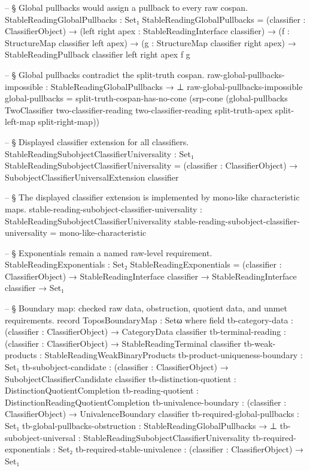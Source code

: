 \documentclass[11pt]{article}
\begin{document}
\begin{code}
-- § Global pullbacks would assign a pullback to every raw cospan.
StableReadingGlobalPullbacks : Set₁
StableReadingGlobalPullbacks =
  (classifier : ClassifierObject) →
  (left right apex : StableReadingInterface classifier) →
  (f : StructureMap classifier left apex) →
  (g : StructureMap classifier right apex) →
  StableReadingPullback classifier {left} {right} {apex} f g

-- § Global pullbacks contradict the split-truth cospan.
raw-global-pullbacks-impossible : StableReadingGlobalPullbacks → ⊥
raw-global-pullbacks-impossible global-pullbacks =
  split-truth-cospan-has-no-cone
    (srp-cone
      (global-pullbacks
        TwoClassifier
        two-classifier-reading
        two-classifier-reading
        split-truth-apex
        split-left-map
        split-right-map))

-- § Displayed classifier extension for all classifiers.
StableReadingSubobjectClassifierUniversality : Set₁
StableReadingSubobjectClassifierUniversality =
  (classifier : ClassifierObject) → SubobjectClassifierUniversalExtension classifier

-- § The displayed classifier extension is implemented by mono-like characteristic maps.
stable-reading-subobject-classifier-universality :
  StableReadingSubobjectClassifierUniversality
stable-reading-subobject-classifier-universality = mono-like-characteristic

-- § Exponentials remain a named raw-level requirement.
StableReadingExponentials : Set₂
StableReadingExponentials =
  (classifier : ClassifierObject) →
  StableReadingInterface classifier →
  StableReadingInterface classifier →
  Set₁

-- § Boundary map: checked raw data, obstruction, quotient data, and unmet requirements.
record ToposBoundaryMap : Setω where
  field
    tb-category-data       : (classifier : ClassifierObject) → CategoryData classifier
    tb-terminal-reading    : (classifier : ClassifierObject) →
                             StableReadingTerminal classifier
    tb-weak-products       : StableReadingWeakBinaryProducts
    tb-product-uniqueness-boundary : Set₁
    tb-subobject-candidate : (classifier : ClassifierObject) →
                             SubobjectClassifierCandidate classifier
    tb-distinction-quotient : DistinctionQuotientCompletion
    tb-reading-quotient    : DistinctionReadingQuotientCompletion
    tb-univalence-boundary : (classifier : ClassifierObject) →
                             UnivalenceBoundary classifier
    tb-required-global-pullbacks : Set₁
    tb-global-pullbacks-obstruction : StableReadingGlobalPullbacks → ⊥
    tb-subobject-universal : StableReadingSubobjectClassifierUniversality
    tb-required-exponentials : Set₂
    tb-required-stable-univalence : (classifier : ClassifierObject) → Set₁


\end{code}
\end{document}
